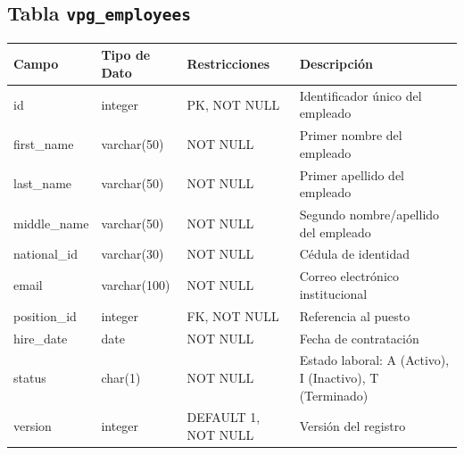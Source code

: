 \begin{center}
	\subsection{Tabla \texttt{vpg\_employees}}
	\small
	\begin{tabular}{|l|l|l|p{6cm}|}
		\hline
		\textbf{Campo} & \textbf{Tipo de Dato} & \textbf{Restricciones} & \textbf{Descripción}                                    \\
		\hline
		id             & integer               & PK, NOT NULL           & Identificador único del empleado                        \\
		first\_name    & varchar(50)           & NOT NULL               & Primer nombre del empleado                              \\
		last\_name     & varchar(50)           & NOT NULL               & Primer apellido del empleado                            \\
		middle\_name   & varchar(50)           & NOT NULL               & Segundo nombre/apellido del empleado                    \\
		national\_id   & varchar(30)           & NOT NULL               & Cédula de identidad                                     \\
		email          & varchar(100)          & NOT NULL               & Correo electrónico institucional                        \\
		position\_id   & integer               & FK, NOT NULL           & Referencia al puesto                                    \\
		hire\_date     & date                  & NOT NULL               & Fecha de contratación                                   \\
		status         & char(1)               & NOT NULL               & Estado laboral: A (Activo), I (Inactivo), T (Terminado) \\
		version        & integer               & DEFAULT 1, NOT NULL    & Versión del registro                                    \\
		\hline
	\end{tabular}
	\normalsize


\end{center}
